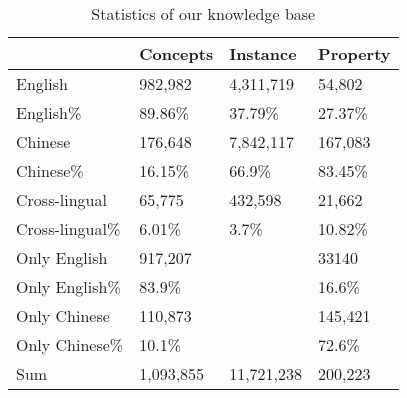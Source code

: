 
\begin{table}[h]
\small
\centering
\caption{Statistics of our knowledge base}
\label{tab:kb-result}
\begin{tabular}{|l|l|l|l|}
\hline
& Concepts  & Instance   & Property \\ \hline
English         & 982,982   & 4,311,719  & 54,802   \\ \hline
English\%       & 89.86\%   & 37.79\%    & 27.37\%  \\ \hline
Chinese         & 176,648   & 7,842,117  & 167,083  \\ \hline
Chinese\%       & 16.15\%   & 66.9\%     & 83.45\%  \\ \hline
Cross-lingual   & 65,775    & 432,598    & 21,662   \\ \hline
Cross-lingual\% & 6.01\%    & 3.7\%      & 10.82\%  \\ \hline
Only English    & 917,207   &            & 33140    \\ \hline
Only English\%  & 83.9\%    &            & 16.6\%   \\ \hline
Only Chinese    & 110,873   &            & 145,421  \\ \hline
Only Chinese\%  & 10.1\%    &            & 72.6\%   \\ \hline
Sum             & 1,093,855 & 11,721,238 & 200,223  \\ \hline
\end{tabular}
\end{table}
